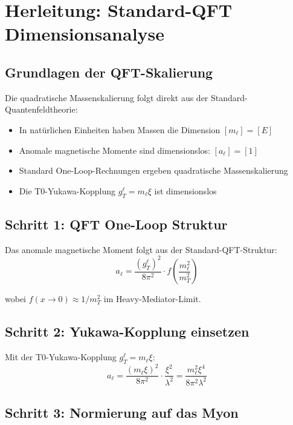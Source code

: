 \documentclass[12pt,a4paper]{article}
\begin{document}
	\section{Herleitung: Standard-QFT Dimensionsanalyse}
	
	\subsection{Grundlagen der QFT-Skalierung}
	
	Die quadratische Massenskalierung folgt direkt aus der Standard-Quantenfeldtheorie:
	\begin{itemize}
		\item In natürlichen Einheiten haben Massen die Dimension $[m_\ell] = [E]$
		\item Anomale magnetische Momente sind dimensionslos: $[a_\ell] = [1]$
		\item Standard One-Loop-Rechnungen ergeben quadratische Massenskalierung
		\item Die T0-Yukawa-Kopplung $g_T^\ell = m_\ell \xi$ ist dimensionslos
	\end{itemize}
	
	\subsection{Schritt 1: QFT One-Loop Struktur}
	
	Das anomale magnetische Moment folgt aus der Standard-QFT-Struktur:
	\begin{equation}
		a_\ell = \frac{(g_T^\ell)^2}{8\pi^2} \cdot f\left(\frac{m_\ell^2}{m_T^2}\right)
	\end{equation}
	
	wobei $f(x \to 0) \approx 1/m_T^2$ im Heavy-Mediator-Limit.
	
	\subsection{Schritt 2: Yukawa-Kopplung einsetzen}
	
	Mit der T0-Yukawa-Kopplung $g_T^\ell = m_\ell \xi$:
	\begin{equation}
		a_\ell = \frac{(m_\ell \xi)^2}{8\pi^2} \cdot \frac{\xi^2}{\lambda^2} = \frac{m_\ell^2 \xi^4}{8\pi^2 \lambda^2}
	\end{equation}
	
	\subsection{Schritt 3: Normierung auf das Myon}
	
\end{document}
